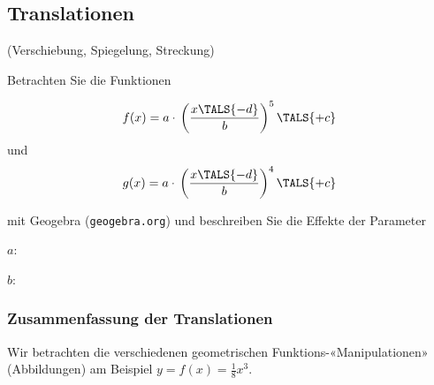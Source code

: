 \subsection{Translationen}
(Verschiebung, Spiegelung,
Streckung)

Betrachten Sie die Funktionen

$$f(x) = a\cdot{}\left(\frac{x\TALS{-d}}b\right)^5\TALS{+c}$$
und
$$g(x) = a\cdot{}\left(\frac{x\TALS{-d}}b\right)^4\TALS{+c}$$

mit Geogebra (\texttt{geogebra.org})
und beschreiben Sie die Effekte der Parameter

$a$: 


$b$: 




\newpage

\subsubsection{Zusammenfassung der Translationen}


Wir betrachten die verschiedenen geometrischen
Funktions-«Manipulationen» (Abbildungen) am Beispiel {\color{red}$y =f(x) = \frac18 x^3$}.


\newcommand{\graphTranslationMultiColumn}[5]{%
  \multicolumn{3}{|l|}{#1}\\%
\hline%
\graphTranslationMultiColumnZ{#2}{#3}{#4}{#5}
}%

\newcommand{\graphTranslationMultiColumnZ}[4]{%
\multirow{5}{6cm}{#1} &  & \multirow{2}{*}{\begin{minipage}{.3\textwidth}\raisebox{-8cm}{\texttt{[image: allg/funktionen/img/translation/\#4]}}\end{minipage}}\\[55mm]%
&\fbox{#2}&\\%
&&\\%
&{\color{red}\fbox{#3}}&\\%
&&\\%
\hline%
}%


